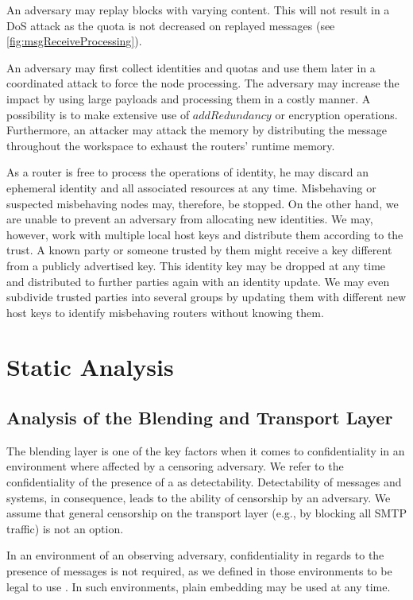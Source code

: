 An adversary may replay blocks with varying content. This will not result in a DoS attack as the quota is not decreased on replayed messages (see \cref{fig:msgReceiveProcessing}).

An adversary may first collect identities and quotas and use them later in a coordinated attack to force the node processing. The adversary may increase the impact by using large payloads and processing them in a costly manner. A possibility is to make extensive use of $addRedundancy$ or encryption operations. Furthermore, an attacker may attack the memory by distributing the message throughout the workspace to exhaust the routers' runtime memory.

As a router is free to process the operations of identity, he may discard an ephemeral identity and all associated resources at any time. Misbehaving or suspected misbehaving nodes may, therefore, be stopped. On the other hand, we are unable to prevent an adversary from allocating new identities. We may, however, work with multiple local host keys and distribute them according to the trust. A known party or someone trusted by them might receive a key different from a publicly advertised key. This identity key may be dropped at any time and distributed to further parties again with an identity update. We may even subdivide trusted parties into several groups by updating them with different new host keys to identify misbehaving routers without knowing them. 

\chapter{Static Analysis}\label{sec:staticAnalysis}
\section{Analysis of the Blending and Transport Layer}\label{sec:analysisBlendingAndTransport}
The blending layer is one of the key factors when it comes to confidentiality in an environment where affected by a censoring adversary. We refer to the confidentiality of the presence of a \VortexNode{} as detectability. Detectability of messages and systems, in consequence, leads to the ability of censorship by an adversary. We assume that general censorship on the transport layer (e.g., by blocking all SMTP traffic) is not an option.

In an environment of an observing adversary, confidentiality in regards to the presence of messages is not required, as we defined in those environments to be legal to use \MessageVortex. In such environments, plain embedding may be used at any time.

